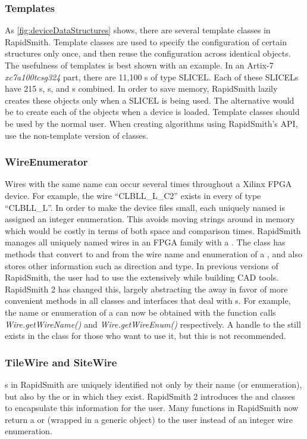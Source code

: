 \subsubsection{Templates}
As \autoref{fig:deviceDataStructures} shows, there are several template
classes in RapidSmith. Template classes are used to specify the configuration of
certain structures only once, and then reuse the configuration across
identical objects. The usefulness of templates is best shown with an example. In
an Artix-7 {\em xc7a100tcsg324} part, there are 11,100 s of type
SLICEL. Each of these SLICELs have 215 s,  s, and
 s combined. In order to save memory, RapidSmith
lazily creates these objects only when a SLICEL  is being used. The
alternative would be to create each of the objects when a device is loaded.
Template classes should  be used by the normal user. When creating
algorithms using RapidSmith's API, use the non-template version of classes.

\subsubsection{WireEnumerator} \label{wireEnum}
Wires with the same name can occur several times throughout a Xilinx FPGA
device. For example, the wire ``CLBLL\-\_L\_C2'' exists in every  of
type ``CLBLL\_L''. In order to make the device files small, each uniquely named 
is assigned an integer enumeration. This avoids moving strings around in
memory which would be costly in terms of both space and comparison times.
RapidSmith manages all uniquely named wires in an FPGA family with a
. The  class has methods that convert to
and from the wire name and enumeration of a , and also stores other
 information such as direction and type. In previous versions of
RapidSmith, the user had to use the  extensively while
building CAD tools. RapidSmith 2 has changed this, largely abstracting the
 away in favor of more convenient methods in all classes and
interfaces that deal with s. For example, the name or enumeration of a
 can now be obtained with the function calls {\em Wire.getWireName()}
and {\em Wire.getWireEnum()} respectively. A handle to the
 still exists in the  class for those who
want to use it, but this is not recommended. 

\subsubsection{TileWire and SiteWire} \label{wires}
s in RapidSmith are uniquely identified not only by their name
(or enumeration), but also by the  or  in which they exist.
RapidSmith 2 introduces the  and  classes to
encapsulate this information for the user. Many functions in RapidSmith now
return a  or  (wrapped in a generic 
object) to the user instead of an integer wire enumeration.

